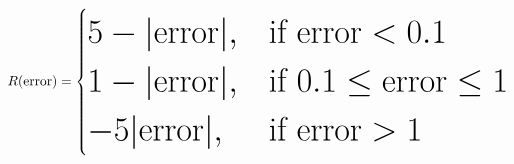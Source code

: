 \documentclass{standalone}
\begin{document}
\boldmath
\bfseries
\[
\Huge
R(\mathrm{error}) =
\begin{cases}
5 - |\mathrm{error}|, & \text{if } \mathrm{error} < 0.1\\
1 - |\mathrm{error}|, & \text{if } 0.1 \leq \mathrm{error} \leq 1\\
-5 |\mathrm{error}|, & \text{if } \mathrm{error} > 1
\end{cases}
\]
\end{document}
